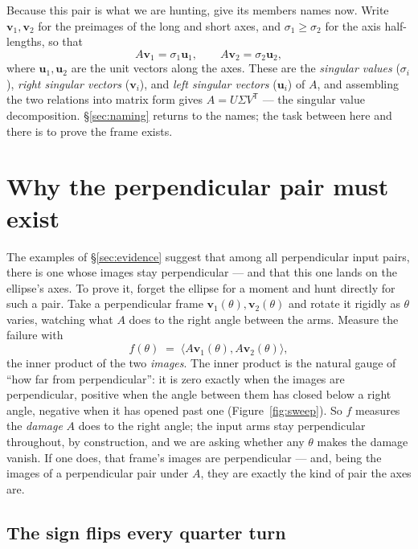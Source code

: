 \documentclass[11pt]{article}
\numberwithin{equation}{section}
\newcommand{\T}{^{\mathsf{T}}}
\newcommand{\ip}[2]{\langle #1, #2 \rangle}
\newcommand{\vv}[1]{\mathbf{v}_{#1}}
\newcommand{\uu}[1]{\mathbf{u}_{#1}}
\theoremstyle{plainish}
\begin{document}
Because this pair is what we are hunting, give its members names now. Write
$\vv1, \vv2$ for the preimages of the long and short axes, and $\sigma_1 \geq
\sigma_2$ for the axis half-lengths, so that
\begin{equation}A\vv1 = \sigma_1 \uu1, \qquad A\vv2 = \sigma_2 \uu2,
\end{equation}
where $\uu1, \uu2$ are the unit vectors along the axes. These are the
\emph{singular values} ($\sigma_i$), \emph{right singular vectors} ($\vv i$), and
\emph{left singular vectors} ($\uu i$) of $A$, and assembling the two relations
into matrix form gives $A = U\Sigma V\T$ --- the singular value decomposition.
\S\ref{sec:naming} returns to the names; the task between here and there is to
prove the frame exists.

\section{Why the perpendicular pair must exist}
\label{sec:existence}

The examples of \S\ref{sec:evidence} suggest that among all perpendicular input
pairs, there is one whose images stay perpendicular --- and that this one lands
on the ellipse's axes. To prove it, forget the ellipse for a moment and hunt
directly for such a pair. Take a perpendicular frame $\vv1(\theta), \vv2(\theta)$
and rotate it rigidly as $\theta$ varies, watching what $A$ does to the right
angle between the arms. Measure the failure with
\begin{equation}f(\theta) \;=\; \ip{A\vv1(\theta)}{A\vv2(\theta)},
\end{equation}
the inner product of the two \emph{images}. The inner product is the natural
gauge of ``how far from perpendicular'': it is zero exactly when the images are
perpendicular, positive when the angle between them has closed below a right
angle, negative when it has opened past one (Figure~\ref{fig:sweep}). So $f$
measures the \emph{damage} $A$ does to the right angle; the input arms stay
perpendicular throughout, by construction, and we are asking whether any $\theta$
makes the damage vanish. If one does, that frame's images are perpendicular ---
and, being the images of a perpendicular pair under $A$, they are exactly the
kind of pair the axes are.

\subsection{The sign flips every quarter turn}
\label{sec:planar}
\end{document}
